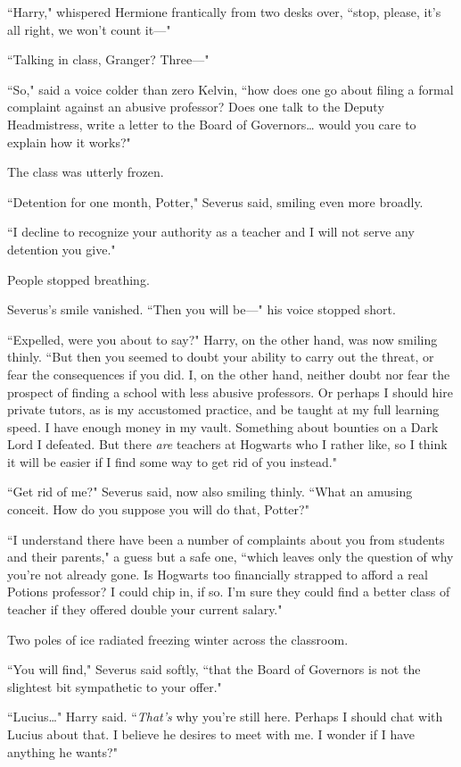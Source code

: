 ``Harry," whispered Hermione frantically from two desks over, ``stop, please, it's all right, we won't count it—"

``Talking in class, Granger? Three—"

``So," said a voice colder than zero Kelvin, ``how does one go about filing a formal complaint against an abusive professor? Does one talk to the Deputy Headmistress, write a letter to the Board of Governors{\ldots} would you care to explain how it works?"

The class was utterly frozen.

``Detention for one month, Potter," Severus said, smiling even more broadly.

``I decline to recognize your authority as a teacher and I will not serve any detention you give."

People stopped breathing.

Severus's smile vanished. ``Then you will be—" his voice stopped short.

``Expelled, were you about to say?" Harry, on the other hand, was now smiling thinly. ``But then you seemed to doubt your ability to carry out the threat, or fear the consequences if you did. I, on the other hand, neither doubt nor fear the prospect of finding a school with less abusive professors. Or perhaps I should hire private tutors, as is my accustomed practice, and be taught at my full learning speed. I have enough money in my vault. Something about bounties on a Dark Lord I defeated. But there \emph{are} teachers at Hogwarts who I rather like, so I think it will be easier if I find some way to get rid of you instead."

``Get rid of me?" Severus said, now also smiling thinly. ``What an amusing conceit. How do you suppose you will do that, Potter?"

``I understand there have been a number of complaints about you from students and their parents," a guess but a safe one, ``which leaves only the question of why you're not already gone. Is Hogwarts too financially strapped to afford a real Potions professor? I could chip in, if so. I'm sure they could find a better class of teacher if they offered double your current salary."

Two poles of ice radiated freezing winter across the classroom.

``You will find," Severus said softly, ``that the Board of Governors is not the slightest bit sympathetic to your offer."

``Lucius{\ldots}" Harry said. ``\emph{That's} why you're still here. Perhaps I should chat with Lucius about that. I believe he desires to meet with me. I wonder if I have anything he wants?"

